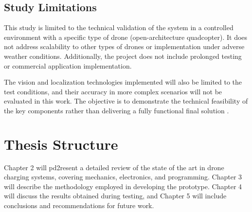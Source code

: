 \subsection{Study Limitations}

This study is limited to the technical validation of the system in a controlled environment with a specific type of drone (open-architecture quadcopter). It does not address scalability to other types of drones or implementation under adverse weather conditions. Additionally, the project does not include prolonged testing or commercial application implementation.

The vision and localization technologies implemented will also be limited to the test conditions, and their accuracy in more complex scenarios will not be evaluated in this work. The objective is to demonstrate the technical feasibility of the key components rather than delivering a fully functional final solution \cite{cite4}.

\section{Thesis Structure}

Chapter 2 will pd2resent a detailed review of the state of the art in drone charging systems, covering mechanics, electronics, and programming. Chapter 3 will describe the methodology employed in developing the prototype. Chapter 4 will discuss the results obtained during testing, and Chapter 5 will include conclusions and recommendations for future work.
